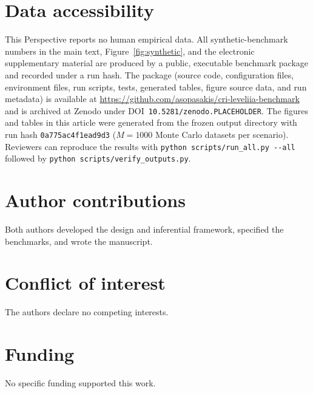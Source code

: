 \documentclass[11pt,a4paper]{article}
\theoremstyle{definition}
\begin{document}
\section*{Data accessibility}
\label{sec:data-access}
This Perspective reports no human empirical data. All synthetic-benchmark numbers
in the main text, Figure~\ref{fig:synthetic}, and the electronic supplementary
material are produced by a public, executable benchmark package and recorded under
a run hash. The package (source code, configuration files, environment files, run
scripts, tests, generated tables, figure source data, and run metadata) is
available at \url{https://github.com/asopasakis/cri-leveliia-benchmark} and is
archived at \mbox{Zenodo} under DOI~\texttt{10.5281/zenodo.PLACEHOLDER}. The
figures and tables in this article were generated from the frozen output directory
with run hash \texttt{0a775ac4f1ead9d3} (\(M=1000\) Monte Carlo datasets per
scenario). Reviewers can reproduce the results with
\texttt{python scripts/run\_all.py -{}-all} followed by
\texttt{python scripts/verify\_outputs.py}.

\section*{Author contributions}
Both authors developed the design and inferential framework, specified the
benchmarks, and wrote the manuscript.

\section*{Conflict of interest}
The authors declare no competing interests.

\section*{Funding}
No specific funding supported this work.
\end{document}
